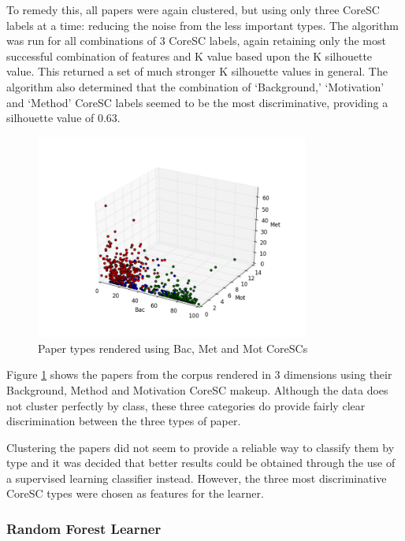 To remedy this, all papers were again clustered, but using only three CoreSC
labels at a time: reducing the noise from the less important types. The
algorithm was run for all combinations of 3 CoreSC labels, again retaining only
the most successful combination of features and K value based upon the K
silhouette value. This returned a set of much stronger K silhouette values in
general. The algorithm also determined that the combination of `Background,'
`Motivation' and `Method' CoreSC labels seemed to be the most
discriminative, providing a silhouette value of 0.63. 

\begin{figure}[!ht]
\centering
\includegraphics[width=0.8\textwidth]{implementation/cluster.png}
\caption{Paper types rendered using Bac, Met and Mot CoreSCs}
\label{fig:clusters}
\end{figure}

Figure \ref{fig:clusters} shows the papers from the corpus rendered in 3
dimensions using their Background, Method and Motivation CoreSC makeup.
Although the data does not cluster perfectly by class, these three categories
do provide fairly clear discrimination between the three types of paper. 

Clustering the papers did not seem to provide a reliable way to classify them
by type and it was decided that better results could be obtained through the
use of a supervised learning classifier instead. However, the three most
discriminative CoreSC types were chosen as features for the learner.

\subsubsection{Random Forest Learner}

